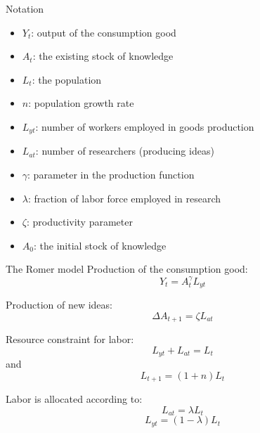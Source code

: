 \documentclass[10pt,handout]{beamer}
\begin{document}
\begin{frame}{Notation}
\begin{itemize}
    \item[] $Y_t$: output of the consumption good
    \item[] $A_t$: the existing stock of knowledge
    \item[] $L_t$: the population
    \item[] $n$: population growth rate
    \item[] $L_{yt}$: number of workers employed in goods production
    \item[] $L_{at}$: number of researchers (producing ideas)
    \item[] $\gamma$: parameter in the production function 
    \item[] $\lambda$: fraction of labor force employed in research
    \item[] $\zeta$: productivity parameter
    \item[] $A_0$: the initial stock of knowledge
\end{itemize}
\end{frame}


\begin{frame}{The Romer model}
    Production of the consumption good:
    \begin{equation}\label{eq39}
        Y_t = A_t^\gamma L_{yt}
    \end{equation}

    Production of new ideas:
    \begin{equation}\label{eq40}
        \Delta A_{t+1} = \zeta L_{at}
    \end{equation}

    Resource constraint for labor:
    \begin{equation}\label{eq41}
        L_{yt} + L_{at} = L_t
    \end{equation}
    and 
        \[L_{t+1}=(1+n)L_t
    \] 
    
    Labor is allocated according to:
    \begin{equation}\label{eq42}
        L_{at} = \lambda L_t
    \end{equation}
    \begin{equation}\label{eq43}
        L_{yt} = (1-\lambda)L_t
    \end{equation}
\end{frame}
\end{document}

